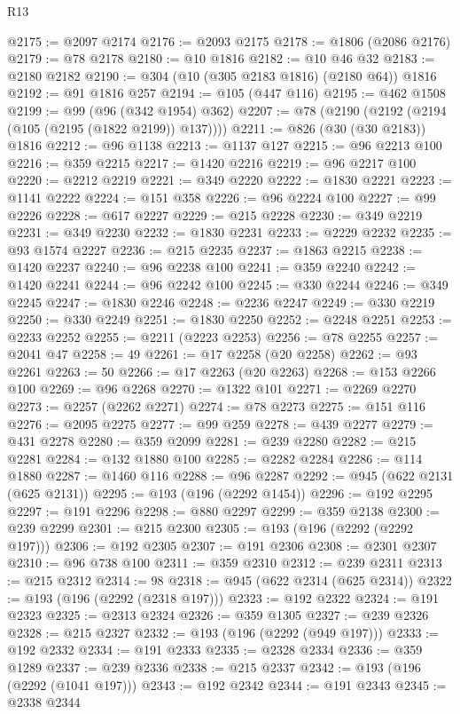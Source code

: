 \begin{lexlean}{R13}
\begin{coremodule}
@2175 := @2097 @2174
@2176 := @2093 @2175
@2178 := @1806 (@2086 @2176)
@2179 := @78 @2178
@2180 := @10 @1816
@2182 := @10 @46 @32
@2183 := @2180 @2182
@2190 := @304 (@10 (@305 @2183 @1816) (@2180 @64)) @1816
@2192 := @91 @1816 @257
@2194 := @105 (@447 @116)
@2195 := @462 @1508
@2199 := @99 (@96 (@342 @1954) @362)
@2207 := @78 (@2190 (@2192 (@2194 (@105 (@2195 (@1822 @2199)) @137))))
@2211 := @826 (@30 (@30 @2183)) @1816
@2212 := @96 @1138
@2213 := @1137 @127
@2215 := @96 @2213 @100
@2216 := @359 @2215
@2217 := @1420 @2216
@2219 := @96 @2217 @100
@2220 := @2212 @2219
@2221 := @349 @2220
@2222 := @1830 @2221
@2223 := @1141 @2222
@2224 := @151 @358
@2226 := @96 @2224 @100
@2227 := @99 @2226
@2228 := @617 @2227
@2229 := @215 @2228
@2230 := @349 @2219
@2231 := @349 @2230
@2232 := @1830 @2231
@2233 := @2229 @2232
@2235 := @93 @1574 @2227
@2236 := @215 @2235
@2237 := @1863 @2215
@2238 := @1420 @2237
@2240 := @96 @2238 @100
@2241 := @359 @2240
@2242 := @1420 @2241
@2244 := @96 @2242 @100
@2245 := @330 @2244
@2246 := @349 @2245
@2247 := @1830 @2246
@2248 := @2236 @2247
@2249 := @330 @2219
@2250 := @330 @2249
@2251 := @1830 @2250
@2252 := @2248 @2251
@2253 := @2233 @2252
@2255 := @2211 (@2223 @2253)
@2256 := @78 @2255
@2257 := @2041 @47
@2258 := 49
@2261 := @17 @2258 (@20 @2258)
@2262 := @93 @2261
@2263 := 50
@2266 := @17 @2263 (@20 @2263)
@2268 := @153 @2266 @100
@2269 := @96 @2268
@2270 := @1322 @101
@2271 := @2269 @2270
@2273 := @2257 (@2262 @2271)
@2274 := @78 @2273
@2275 := @151 @116
@2276 := @2095 @2275
@2277 := @99 @259
@2278 := @439 @2277
@2279 := @431 @2278
@2280 := @359 @2099
@2281 := @239 @2280
@2282 := @215 @2281
@2284 := @132 @1880 @100
@2285 := @2282 @2284
@2286 := @114 @1880
@2287 := @1460 @116
@2288 := @96 @2287
@2292 := @945 (@622 @2131 (@625 @2131))
@2295 := @193 (@196 (@2292 @1454))
@2296 := @192 @2295
@2297 := @191 @2296
@2298 := @880 @2297
@2299 := @359 @2138
@2300 := @239 @2299
@2301 := @215 @2300
@2305 := @193 (@196 (@2292 (@2292 @197)))
@2306 := @192 @2305
@2307 := @191 @2306
@2308 := @2301 @2307
@2310 := @96 @738 @100
@2311 := @359 @2310
@2312 := @239 @2311
@2313 := @215 @2312
@2314 := 98
@2318 := @945 (@622 @2314 (@625 @2314))
@2322 := @193 (@196 (@2292 (@2318 @197)))
@2323 := @192 @2322
@2324 := @191 @2323
@2325 := @2313 @2324
@2326 := @359 @1305
@2327 := @239 @2326
@2328 := @215 @2327
@2332 := @193 (@196 (@2292 (@949 @197)))
@2333 := @192 @2332
@2334 := @191 @2333
@2335 := @2328 @2334
@2336 := @359 @1289
@2337 := @239 @2336
@2338 := @215 @2337
@2342 := @193 (@196 (@2292 (@1041 @197)))
@2343 := @192 @2342
@2344 := @191 @2343
@2345 := @2338 @2344

\end{coremodule}
\end{lexlean}
